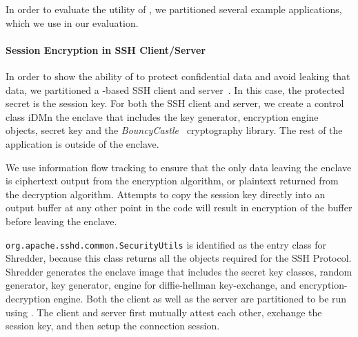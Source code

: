 \label{sec:case-study}

In order to evaluate the utility of \sysname{}, we partitioned
several example \java{} applications, which we use in our evaluation.


\paragraph{Session Encryption in SSH Client/Server}
In order to show the ability of \sysname{} to protect 
confidential data and avoid leaking that data,
we partitioned a \java{}-based SSH client and server~\cite{apache-sshd}.
In this case, the protected secret is the session key.
For both the SSH client and server, we create
a control class iDMn the enclave that includes 
the key generator, encryption engine objects, secret key
and the {\em BouncyCastle}~\cite{bouncycastle} cryptography library.
The rest of the application is outside of the enclave.

We use information flow tracking to ensure that the only data
leaving the enclave is ciphertext output from the encryption algorithm,
or plaintext returned from the decryption algorithm.
Attempts to copy the session key directly into an output buffer at any other point in the code
will result in encryption of the buffer before leaving the enclave.

{\tt org.apache.sshd.common.SecurityUtils} is identified as the entry class for Shredder, because this class returns all the objects required for the SSH Protocol.
Shredder generates the enclave image that includes the secret key classes, random generator, key generator, engine for diffie-hellman key-exchange, and encryption-decryption engine. Both the client as well as the server are partitioned to be run using \sysname{}. The client and server first mutually attest each other, exchange the session key, and then setup the connection session.

